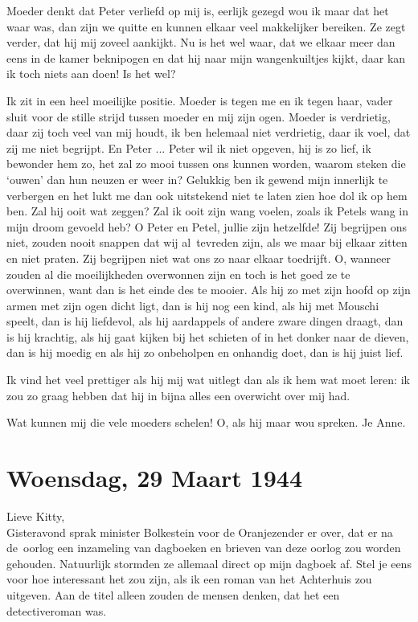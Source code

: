 \documentclass{book}
\begin{document}
Moeder denkt dat Peter verliefd op mij is, eerlijk gezegd wou ik maar dat het
waar was, dan zijn we quitte en kunnen elkaar veel makkelijker bereiken. Ze zegt
verder, dat hij mij zoveel aankijkt. Nu is het wel waar, dat we elkaar meer dan
eens in de kamer beknipogen en dat hij naar mijn wangenkuiltjes kijkt, daar kan
ik toch niets aan doen! Is het wel?

Ik zit in een heel moeilijke positie. Moeder is tegen me en ik tegen haar, vader
sluit voor de stille strijd tussen moeder en mij zijn ogen.  Moeder is
verdrietig, daar zij toch veel van mij houdt, ik ben helemaal niet verdrietig,
daar ik voel, dat zij me niet begrijpt. En Peter ...  Peter wil ik niet opgeven,
hij is zo lief, ik bewonder hem zo, het zal zo mooi tussen ons kunnen worden,
waarom steken die `ouwen' dan hun neuzen er weer in? Gelukkig ben ik gewend mijn
innerlijk te verbergen en het lukt me dan ook uitstekend niet te laten zien hoe
dol ik op hem ben.  Zal hij ooit wat zeggen? Zal ik ooit zijn wang voelen, zoals
ik Petels wang in mijn droom gevoeld heb? O Peter en Petel, jullie zijn
hetzelfde!  Zij begrijpen ons niet, zouden nooit snappen dat wij al~tevreden
zijn, als we maar bij elkaar zitten en niet praten. Zij begrijpen niet wat ons
zo naar elkaar toedrijft. O, wanneer zouden al die moeilijkheden overwonnen zijn
en toch is het goed ze te overwinnen, want dan is het einde des te mooier. Als
hij zo met zijn hoofd op zijn armen met zijn ogen dicht ligt, dan is hij nog een
kind, als hij met Mouschi speelt, dan is hij liefdevol, als hij aardappels of
andere zware dingen draagt, dan is hij krachtig, als hij gaat kijken bij het
schieten of in het donker naar de dieven, dan is hij moedig en als hij zo
onbeholpen en onhandig doet, dan is hij juist lief.

Ik vind het veel prettiger als hij mij wat uitlegt dan als ik hem wat moet
leren: ik zou zo graag hebben dat hij in bijna alles een overwicht over mij had.

Wat kunnen mij die vele moeders schelen! O, als hij maar wou spreken. Je Anne.

\section*{Woensdag, 29 Maart 1944}

Lieve Kitty,\\
Gisteravond sprak minister Bolkestein voor de Oranjezender er
over, dat er na de~oorlog een inzameling van dagboeken en brieven van deze
oorlog zou worden gehouden. Natuurlijk stormden ze allemaal direct op mijn
dagboek af. Stel je eens voor hoe interessant het zou zijn, als ik een roman van
het Achterhuis zou uitgeven. Aan de titel alleen zouden de mensen denken, dat
het een detectiveroman was.
\end{document}

